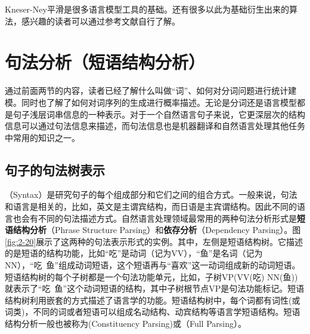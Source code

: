 \parinterval Kneser-Ney平滑是很多语言模型工具的基础\cite{wang-etal-2018-niutrans}\cite{heafield-2011-kenlm}\cite{stolcke2002srilm}。还有很多以此为基础衍生出来的算法，感兴趣的读者可以通过参考文献自行了解\cite{parsing2009speech}\cite{ney1994structuring}\cite{chen1999empirical}。


\sectionnewpage
\section{句法分析（短语结构分析）}
\parinterval 通过前面两节的内容，读者已经了解什么叫做``词''、如何对分词问题进行统计建模。同时也了解了如何对词序列的生成进行概率描述。无论是分词还是语言模型都是句子浅层词串信息的一种表示。对于一个自然语言句子来说，它更深层次的结构信息可以通过句法信息来描述，而句法信息也是机器翻译和自然语言处理其他任务中常用的知识之一。


\subsection{句子的句法树表示}

（Syntax）是研究句子的每个组成部分和它们之间的组合方式。一般来说，句法和语言是相关的，比如，英文是主谓宾结构，而日语是主宾谓结构。因此不同的语言也会有不同的句法描述方式。自然语言处理领域最常用的两种句法分析形式是{\small\sffamily\bfseries{短语结构分析}}（Phrase Structure Parsing）和{\small\sffamily\bfseries{依存分析}}（Dependency Parsing）。图\ref{fig:2-20}展示了这两种的句法表示形式的实例。其中，左侧是短语结构树。它描述的是短语的结构功能，比如``吃''是动词（记为VV），``鱼''是名词（记为NN），``吃\ 鱼''组成动词短语，这个短语再与``喜欢''这一动词组成新的动词短语。短语结构树的每个子树都是一个句法功能单元，比如，子树VP(VV(吃) NN(鱼))就表示了``吃\ 鱼''这个动词短语的结构，其中子树根节点VP是句法功能标记。短语结构树利用嵌套的方式描述了语言学的功能。短语结构树中，每个词都有词性(或词类)，不同的词或者短语可以组成名动结构、动宾结构等语言学短语结构。短语结构分析一般也被称为{\small{}}(Constituency Parsing)或{\small{}}（Full Parsing）。

